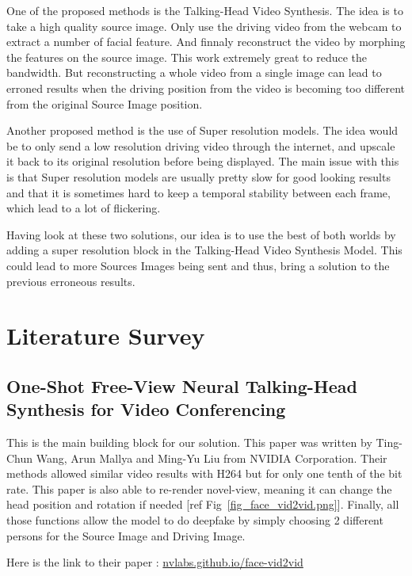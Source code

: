 \documentclass[twocolumn,10pt]{asme2ej}
\begin{document}
One of the proposed methods is the Talking-Head Video Synthesis. The idea is to take a high quality source image. Only use the driving video from the webcam to extract a number of facial feature. And finnaly reconstruct the video by morphing the features on the source image. This work extremely great to reduce the bandwidth. But reconstructing a whole video from a single image can lead to erroned results when the driving position from the video is becoming too different from the original Source Image position.

Another proposed method is the use of Super resolution models. The idea would be to only send a low resolution driving video through the internet, and upscale it back to its original resolution before being displayed. The main issue with this is that Super resolution models are usually pretty slow for good looking results and that it is sometimes hard to keep a temporal stability between each frame, which lead to a lot of flickering.

Having look at these two solutions, our idea is to use the best of both worlds by adding a super resolution block in the Talking-Head Video Synthesis Model. This could lead to more Sources Images being sent and thus, bring a solution to the previous erroneous results.

\section{Literature Survey}

\subsection{One-Shot Free-View Neural Talking-Head Synthesis for Video Conferencing}

This is the main building block for our solution. This paper was written by Ting-Chun Wang, Arun Mallya and Ming-Yu Liu from NVIDIA Corporation. Their methods allowed similar video results with H264 but for only one tenth of the bit rate. This paper is also able to re-render novel-view, meaning it can change the head position and rotation if needed [ref Fig~\ref{fig_face_vid2vid.png}]. Finally, all those functions allow the model to do deepfake by simply choosing 2 different persons for the Source Image and Driving Image.

Here is the link to their paper : \href{https://nvlabs.github.io/face-vid2vid/}{nvlabs.github.io/face-vid2vid}
\end{document}
